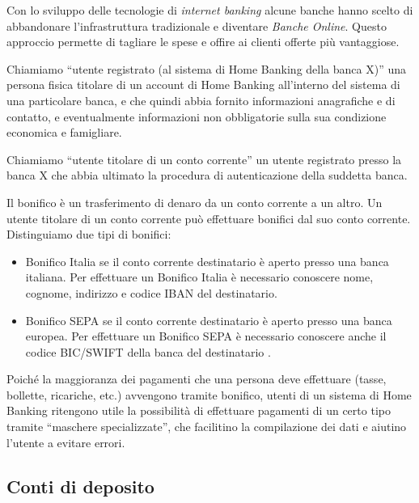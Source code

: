 \documentclass[10pt]{softeng} %
\begin{document}
Con lo sviluppo delle tecnologie di \emph{internet banking} alcune banche hanno scelto di abbandonare l'infrastruttura tradizionale e diventare \emph{Banche Online}.
Questo approccio permette di tagliare le spese e offire ai clienti offerte pi\`u vantaggiose.

Chiamiamo ``utente registrato (al sistema di Home Banking della banca X)'' una persona fisica titolare di un account di Home Banking all'interno del sistema di una particolare banca, e che quindi abbia fornito informazioni anagrafiche e di contatto, e eventualmente informazioni non obbligatorie sulla sua condizione economica e famigliare.

Chiamiamo ``utente titolare di un conto corrente'' un utente registrato presso la banca X che abbia ultimato la procedura di autenticazione della suddetta banca.

Il bonifico \`e un trasferimento di denaro da un conto corrente a un altro.
Un utente titolare di un conto corrente pu\`o effettuare bonifici dal suo conto corrente.
Distinguiamo due tipi di bonifici:
\begin{itemize}
	\item Bonifico Italia se il conto corrente destinatario \`e aperto presso una banca italiana.
	Per effettuare un Bonifico Italia \`e necessario conoscere nome, cognome, indirizzo e codice IBAN del destinatario.
	\item Bonifico SEPA se il conto corrente destinatario \`e aperto presso una banca europea. Per effettuare un Bonifico SEPA \`e necessario conoscere anche il codice BIC/SWIFT della banca del destinatario \cite{bonifico_unicredit}.
\end{itemize}
Poich\'e la maggioranza dei pagamenti che una persona deve effettuare (tasse, bollette, ricariche, etc.) avvengono tramite bonifico, utenti di un sistema di Home Banking ritengono utile la possibilit\`a di effettuare pagamenti di un certo tipo tramite ``maschere specializzate'', che facilitino la compilazione dei dati e aiutino l'utente a evitare errori.

\subsection{Conti di deposito}
\end{document}
